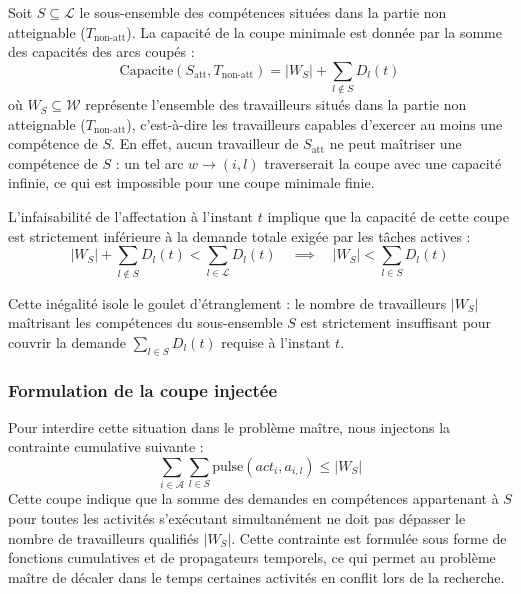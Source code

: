 Soit $S \subseteq \mathcal{L}$ le sous-ensemble des compétences situées dans la partie non atteignable ($T_{\text{non-att}}$). La capacité de la coupe minimale est donnée par la somme des capacités des arcs coupés :
\begin{equation}
    \text{Capacite}(S_{\text{att}}, T_{\text{non-att}}) = |W_S| + \sum_{l \notin S} D_l(t)
\end{equation}
où $W_S \subseteq \mathcal{W}$ représente l'ensemble des travailleurs situés dans la partie non atteignable ($T_{\text{non-att}}$), c'est-à-dire les travailleurs capables d'exercer au moins une compétence de $S$. En effet, aucun travailleur de $S_{\text{att}}$ ne peut maîtriser une compétence de $S$ : un tel arc $w \to (i,l)$ traverserait la coupe avec une capacité infinie, ce qui est impossible pour une coupe minimale finie.

L'infaisabilité de l'affectation à l'instant $t$ implique que la capacité de cette coupe est strictement inférieure à la demande totale exigée par les tâches actives :
\begin{equation}
    |W_S| + \sum_{l \notin S} D_l(t) < \sum_{l \in \mathcal{L}} D_l(t) \quad \implies \quad |W_S| < \sum_{l \in S} D_l(t)
\end{equation}

Cette inégalité isole le goulet d'étranglement : le nombre de travailleurs $|W_S|$ maîtrisant les compétences du sous-ensemble $S$ est strictement insuffisant pour couvrir la demande $\sum_{l \in S} D_l(t)$ requise à l'instant $t$.

\subsubsection{Formulation de la coupe injectée}
Pour interdire cette situation dans le problème maître, nous injectons la contrainte cumulative suivante :
\begin{equation}
    \sum_{i \in \mathcal{A}} \sum_{l \in S} \text{pulse}(act_i, a_{i,l}) \leq |W_S|
\end{equation}
Cette coupe indique que la somme des demandes en compétences appartenant à $S$ pour toutes les activités s'exécutant simultanément ne doit pas dépasser le nombre de travailleurs qualifiés $|W_S|$. Cette contrainte est formulée sous forme de fonctions cumulatives et de propagateurs temporels, ce qui permet au problème maître de décaler dans le temps certaines activités en conflit lors de la recherche.
